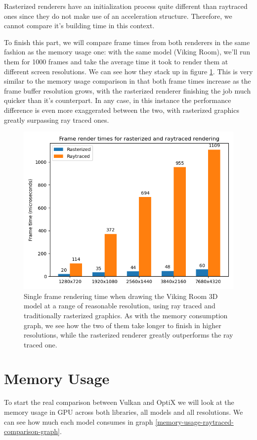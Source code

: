 Rasterized renderers have an initialization process quite different than raytraced ones since they do not make use of an acceleration structure. Therefore, we cannot compare it's building time in this context.

To finish this part, we will compare frame times from both renderers in the same fashion as the memory usage one: with the same model (Viking Room), we'll run them for 1000 frames and take the average time it took to render them at different screen resolutions. We can see how they stack up in figure \ref{frametimes-comparison-graph}. This is very similar to the memory usage comparison in that both frame times increase as the frame buffer resolution grows, with the rasterized renderer finishing the job much quicker than it's counterpart. In any case, in this instance the performance difference is even more exaggerated between the two, with rasterized graphics greatly surpassing ray traced ones.

\begin{figure}[hbt!]
    \centering
    \includegraphics[width=1.0\textwidth]{figuras/vulkan-frametimes-comparison.png}
    \caption{Single frame rendering time when drawing the Viking Room 3D model at a range of reasonable resolution, using ray traced and traditionally rasterized graphics. As with the memory consumption graph, we see how the two of them take longer to finish in higher resolutions, while the rasterized renderer greatly outperforms the ray traced one.}
    \label{frametimes-comparison-graph}
\end{figure}

\section{Memory Usage}
To start the real comparison between Vulkan and OptiX we will look at the memory usage in GPU across both libraries, all models and all resolutions. We can see how much each model consumes in graph \ref{memory-usage-raytraced-comparison-graph}.

